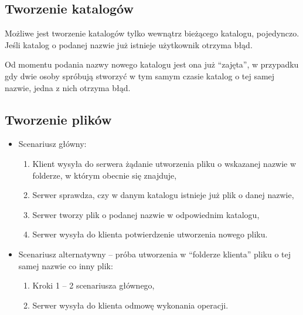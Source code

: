 \documentclass[10pt,a4paper]{article}
\newcommand{\quotes}[1]{``#1''}
\begin{document}
\subsection{Tworzenie katalogów}
Możliwe jest tworzenie katalogów tylko wewnątrz bieżącego katalogu, pojedynczo. Jeśli katalog o podanej nazwie już istnieje użytkownik otrzyma błąd.

Od momentu podania nazwy nowego katalogu jest ona już \quotes{zajęta}, w przypadku gdy dwie osoby spróbują stworzyć w tym samym czasie katalog o tej samej nazwie, jedna z nich otrzyma błąd.

\subsection{Tworzenie plików}
\begin{itemize}
    \item Scenariusz główny:
    \begin{enumerate}
        \item Klient wysyła do serwera żądanie utworzenia pliku o wskazanej nazwie w folderze, w którym obecnie się znajduje,
        \item Serwer sprawdza, czy w danym katalogu istnieje już plik o danej nazwie,
        \item Serwer tworzy plik o podanej nazwie w odpowiednim katalogu,
        \item Serwer wysyła do klienta potwierdzenie utworzenia nowego pliku.
    \end{enumerate}

    \item Scenariusz alternatywny -- próba utworzenia w \quotes{folderze klienta} pliku o tej samej nazwie co inny plik:
    \begin{enumerate}
        \item Kroki 1 -- 2 scenariusza głównego,
        \item Serwer wysyła do klienta odmowę wykonania operacji.
    \end{enumerate}
\end{itemize}
\end{document}
